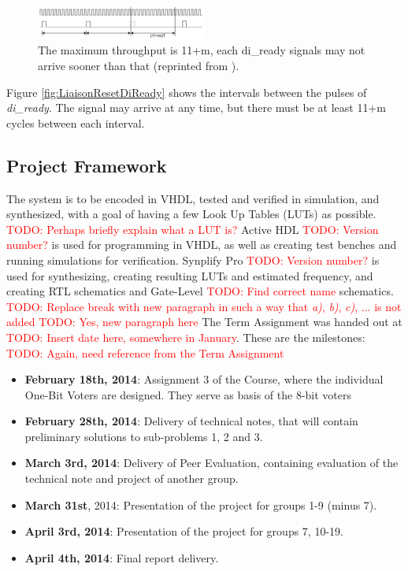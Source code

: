 \documentclass[a4paper]{IEEEtran}
\newcommand\TODO[1]{\textcolor{red}{TODO:#1}}
\newcommand\todo[1]{\TODO{#1}}
\begin{document}
\begin{figure}[h!]
    \centering
    \includegraphics[width=0.5\textwidth]{Figures/ProjectDescription/LiaisonMaxThroughput}
    \caption{The maximum throughput is 11+m, each di\_ready signals may not arrive sooner than that (reprinted from \protect\cite{assignment-text}).}
    \label{fig:LiaisonMaxThroughput}
\end{figure}

Figure \ref{fig:LiaisonResetDiReady} shows the intervals between the pulses of \textit{di\_ready}. The signal may arrive at any time, but there must be at least 11+m cycles between each interval.

\subsection{Project Framework}
The system is to be encoded in VHDL, tested and verified in simulation, and synthesized, with a goal of having a few Look Up Tables (LUTs) as possible. \todo{ Perhaps briefly explain what a LUT is?}
Active HDL \todo{ Version number?} is used for programming in VHDL, as well as creating test benches and running simulations for verification.
Synplify Pro \todo{ Version number?} is used for synthesizing, creating resulting LUTs and estimated frequency, and creating RTL schematics and Gate-Level \todo{ Find correct name} schematics. 
\break 
\todo{ Replace break with new paragraph in such a way that \textit{a)}, \textit{b)}, \textit{c)}, ... is not added}
\break
\todo{ Yes, new paragraph here} The Term Assignment was handed out at \todo{ Insert date here, somewhere in January}. These are the milestones: \todo{ Again, need reference from the Term Assignment}
\begin{itemize}
    \item \textbf{February 18th, 2014}: Assignment 3 of the Course, where the individual One-Bit Voters are designed. They serve as basis of the 8-bit voters
    \item \textbf{February 28th, 2014}: Delivery of technical notes, that will contain preliminary solutions to sub-problems 1, 2 and 3.
    \item \textbf{March 3rd, 2014}: Delivery of Peer Evaluation, containing evaluation of the technical note and project of another group.
    \item \textbf{March 31st}, 2014: Presentation of the project for groups 1-9 (minus 7).
    \item \textbf{April 3rd, 2014}: Presentation of the project for groups 7, 10-19.
    \item \textbf{April 4th, 2014}: Final report delivery.
\end{itemize}
\end{document}
